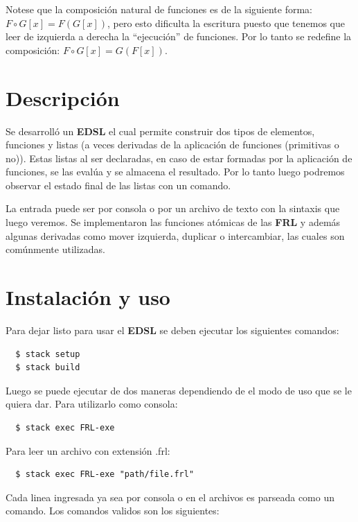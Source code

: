 \documentclass[a4paper,13pt,proof]{article}
\theoremstyle{mytheor}
\begin{document}
Notese que la composición natural de funciones es de la siguiente forma: $F \circ G [x] = F(G[x]) $, pero esto dificulta la escritura puesto que tenemos que leer de izquierda a derecha la ``ejecución'' de funciones. Por lo tanto se redefine la composición:  $F \circ G [x] = G(F[x]) $.

\section{Descripción}

Se desarrolló un \textbf{EDSL} el cual permite construir dos tipos de elementos, funciones y listas (a veces derivadas de la aplicación de funciones (primitivas o no)). Estas listas al ser declaradas, en caso de estar formadas por la aplicación de funciones, se las evalúa y se almacena el resultado. Por lo tanto luego podremos observar el estado final de las listas con un comando.

La entrada puede ser por consola o por un archivo de texto con la sintaxis que luego veremos.
Se implementaron las funciones atómicas de las \textbf{FRL} y además algunas derivadas como mover izquierda, duplicar o intercambiar, las cuales son comúnmente utilizadas.

\section{Instalación y uso}
\noindent
Para dejar listo para usar el \textbf{EDSL} se deben ejecutar los siguientes comandos:

\begin{verbatim}
  $ stack setup
  $ stack build
\end{verbatim}
\noindent
Luego se puede ejecutar de dos maneras dependiendo de el modo de uso que se le quiera dar.
\noindent
Para utilizarlo como consola:

\begin{verbatim}
  $ stack exec FRL-exe
\end{verbatim}
\noindent
Para leer un archivo con extensión .frl:

\begin{verbatim}
  $ stack exec FRL-exe "path/file.frl"
\end{verbatim}

Cada linea ingresada ya sea por consola o en el archivos es parseada como un comando. Los comandos validos son los siguientes:
\end{document}
